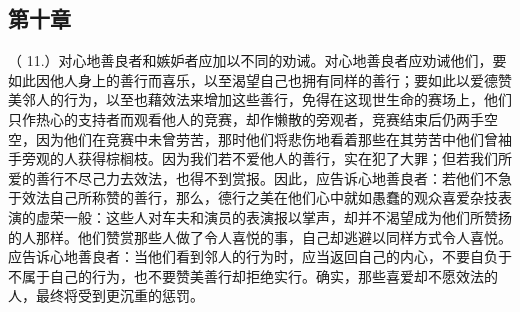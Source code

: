 
\subsection{第十章}

\par

（ 11.）对心地善良者和嫉妒者应加以不同的劝诫。对心地善良者应劝诫他们，要如此因他人身上的善行而喜乐，以至渴望自己也拥有同样的善行；要如此以爱德赞美邻人的行为，以至也藉效法来增加这些善行，免得在这现世生命的赛场上，他们只作热心的支持者而观看他人的竞赛，却作懒散的旁观者，竞赛结束后仍两手空空，因为他们在竞赛中未曾劳苦，那时他们将悲伤地看着那些在其劳苦中他们曾袖手旁观的人获得棕榈枝。因为我们若不爱他人的善行，实在犯了大罪；但若我们所爱的善行不尽己力去效法，也得不到赏报。因此，应告诉心地善良者：若他们不急于效法自己所称赞的善行，那么，德行之美在他们心中就如愚蠢的观众喜爱杂技表演的虚荣一般：这些人对车夫和演员的表演报以掌声，却并不渴望成为他们所赞扬的人那样。他们赞赏那些人做了令人喜悦的事，自己却逃避以同样方式令人喜悦。应告诉心地善良者：当他们看到邻人的行为时，应当返回自己的内心，不要自负于不属于自己的行为，也不要赞美善行却拒绝实行。确实，那些喜爱却不愿效法的人，最终将受到更沉重的惩罚。\par

